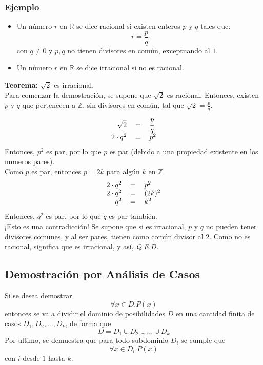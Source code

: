 \documentclass[../main.tex]{subfiles}
\begin{document}
\subsubsection*{Ejemplo}
\begin{itemize}
    \item Un número $r$ en $\mathds{R}$ se dice racional si existen enteros $p$ y $q$ tales que: \[ r = \frac{p}{q} \]con $q \not= 0$ y $p, q$ no tienen divisores en común, exceptuando al $1$.
    \item Un número $r$ en $\mathds{R}$ se dice irracional si no es racional.
\end{itemize}
\textbf{Teorema:} $\sqrt{2}$ es irracional.\\
Para comenzar la demostración, se supone que $\sqrt{2}$ es racional. Entonces, existen $p$ y $q$ que pertenecen a $\mathds{Z}$, sin divisores en común, tal que $\sqrt{2} = \frac{p}{q}$.
\[
    \begin{tabular}{rcl}
        $\sqrt{2}$ & $=$ & $\cfrac{p}{q}$\\
        $2 \cdot q^2$ & $=$ & $p^2$\\
        
    \end{tabular}
\]
Entonces, $p^2$ es par, por lo que $p$ es par (debido a una propiedad existente en los numeros pares).\\
Como $p$ es par, entonces $p = 2k$ para algún $k$ en $\mathds{Z}$.
\[
    \begin{tabular}{rcl}
        $2 \cdot q^2$ & $=$ & $p^2$\\
        $2 \cdot q^2$ & $=$ & $(2k)^2$\\
        $q^2$ & $=$ & $k^2$\\
    \end{tabular}
\]
Entonces, $q^2$ es par, por lo que $q$ es par también.\\
¡Esto es una contradicción! Se supone que si es irracional, $p$ y $q$ no pueden tener divisores comunes, y al ser pares, tienen como común divisor al $2$. Como no es racional, significa que es irracional, y así, \textit{Q.E.D.}

\subsection{Demostración por Análisis de Casos}
Si se desea demostrar
\[ \forall x \in D . P(x) \]
entonces se va a dividir el dominio de posibilidades $D$ en una cantidad finita de casos $D_{1}, D_{2}, \ldots, D_{k}$, de forma que
\[ D = D_{1} \cup D_{2} \cup \ldots \cup D_{k} \]
Por ultimo, se demuestra que para todo subdominio $D_{i}$ se cumple que
\[ \forall x \in D_{i} . P(x) \]
con $i$ desde $1$ hasta $k$.
\end{document}
